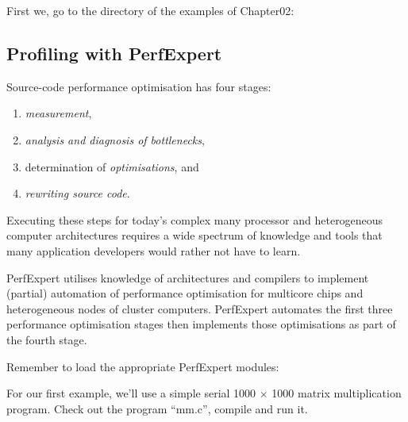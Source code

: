 First we, go to the directory of the examples of Chapter02:

\begin{prompt}
\end{prompt}

\subsection{Profiling with PerfExpert}
\label{subsec:Profiling_with_PerfExpert}

Source-code performance optimisation has four stages:

\begin{enumerate}
  \item  \emph{measurement},
  \item  \emph{analysis and diagnosis of bottlenecks},
  \item  determination of \emph{optimisations}, and
  \item  \emph{rewriting source code}.
\end{enumerate}

Executing these steps for today's complex many processor and heterogeneous computer architectures requires a wide spectrum of knowledge and tools that many application developers would rather not have to learn.

PerfExpert utilises knowledge of architectures and compilers to implement (partial) automation of performance optimisation for multicore chips and heterogeneous nodes of cluster computers. PerfExpert automates the first three performance optimisation stages then implements those optimisations as part of the fourth stage.

Remember to load the appropriate PerfExpert modules:

\iftacc
\begin{prompt}
\end{prompt}
\fi
\ifvsc
\begin{prompt}
\end{prompt}
\fi

For our first example, we'll use a simple serial 1000 $\times$ 1000 matrix multiplication program. Check out the program ``mm.c'', compile and run it.

\begin{prompt}
\end{prompt}

